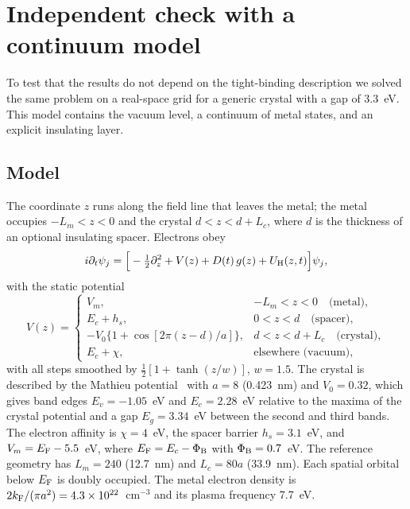 \documentclass[aps,prl,onecolumn,superscriptaddress,notitlepage]{revtex4-2}
\begin{document}
\begin{table}[h]
\caption{Harmonic yields of the in-plane emission of the strip with 33 columns at
$F_{\rm m}=0.75$~V/nm, normalized to the linear yield of the insulated strip. ``Two independent
ends'' is the mirror-symmetric combination $J[F]-J[-F]$ of the two runs with one end in contact,
normalized to the linear yield of two strips.}
\label{tab:sym}

\end{table}



\section{Independent check with a continuum model}
\label{sec:cont}
To test that the results do not depend on the tight-binding description we solved the same problem
on a real-space grid for a generic crystal with a gap of 3.3~eV. This model contains the vacuum
level, a continuum of metal states, and an explicit insulating layer.

\subsection{Model}
The coordinate $z$ runs along the field line that leaves the metal; the metal occupies $-L_m<z<0$
and the crystal $d<z<d+L_c$, where $d$ is the thickness of an optional insulating spacer. Electrons
obey
\begin{equation}
i\partial_t\psi_j=\Big[-\tfrac12\partial_z^2+V(z)+D(t)\,g(z)+U_{\rm H}(z,t)\Big]\psi_j ,
\end{equation}
with the static potential
\begin{equation}
V(z)=\begin{cases}
V_m, & -L_m<z<0 \quad\text{(metal)},\\
E_c+h_s, & 0<z<d \quad\text{(spacer)},\\
-V_0\{1+\cos[2\pi(z-d)/a]\}, & d<z<d+L_c \quad\text{(crystal)},\\
E_c+\chi, & \text{elsewhere (vacuum)},
\end{cases}
\end{equation}
with all steps smoothed by $\tfrac12[1+\tanh(z/w)]$, $w=1.5$. The crystal is described by the
Mathieu potential~\cite{wu2015} with $a=8$ (0.423~nm) and $V_0=0.32$, which gives band edges
$E_v=-1.05$~eV and $E_c=2.28$~eV relative to the maxima of the crystal potential and a gap
$E_g=3.34$~eV between the second and third bands. The electron affinity is $\chi=4$~eV, the spacer
barrier $h_s=3.1$~eV, and $V_m=E_{\rm F}-5.5$~eV, where $E_{\rm F}=E_c-\Phi_{\rm B}$ with
$\Phi_{\rm B}=0.7$~eV. The reference geometry has $L_m=240$ (12.7~nm) and $L_c=80a$ (33.9~nm). Each
spatial orbital below $E_{\rm F}$ is doubly occupied. The metal electron density is
$2k_{\rm F}/(\pi a^2)=4.3\times10^{22}$~cm$^{-3}$ and its plasma frequency 7.7~eV.
\end{document}
